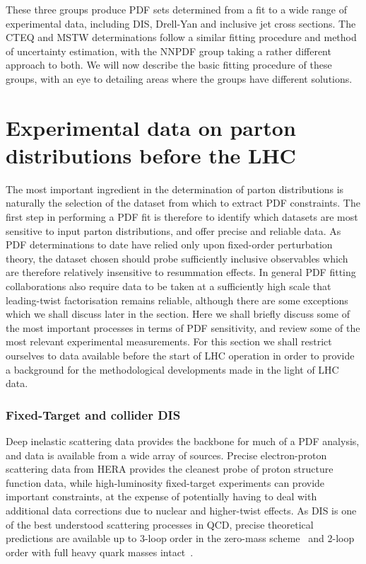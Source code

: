 These three groups produce PDF sets determined from a fit to a wide range of experimental data, including DIS, Drell-Yan and inclusive jet cross sections. The CTEQ and MSTW determinations follow a similar fitting procedure and method of uncertainty estimation, with the NNPDF group taking a rather different approach to both. We will now describe the basic fitting procedure of these groups, with an eye to detailing areas where the groups have different solutions.

\section{Experimental data on parton distributions before the LHC}
The most important ingredient in the determination of parton distributions is naturally the selection of the dataset from which to extract PDF constraints. The first step in performing a PDF fit is therefore to identify which datasets are most sensitive to input parton distributions, and offer precise and reliable data. As PDF determinations to date have relied only upon fixed-order perturbation theory, the dataset chosen should probe sufficiently inclusive observables which are therefore relatively insensitive to resummation effects. In general PDF fitting collaborations also require data to be taken at a sufficiently high scale that leading-twist factorisation remains reliable, although there are some exceptions which we shall discuss later in the section. Here we shall briefly discuss some of the most important processes in terms of PDF sensitivity, and review some of the most relevant experimental measurements. For this section we shall restrict ourselves to data available before the start of LHC operation in order to provide a background for the methodological developments made in the light of LHC data. 

\subsubsection{Fixed-Target and collider DIS}
Deep inelastic scattering data provides the backbone for much of a PDF analysis, and data is available from a wide array of sources. Precise electron-proton scattering data from HERA provides the cleanest probe of proton structure function data, while high-luminosity fixed-target experiments can provide important constraints, at the expense of potentially having to deal with additional data corrections due to nuclear and higher-twist effects. As DIS is one of the best understood scattering processes in QCD, precise theoretical predictions are available up to 3-loop order in the zero-mass scheme~\cite{Vermaseren:2005qc,Moch:2008fj} and 2-loop order with full heavy quark masses intact~\cite{Buza:1997mg,Buza:1996xr,Blumlein:2006mh,Bierenbaum:2007qe,Bierenbaum:2007dm,Bierenbaum:2009zt,Blumlein:2014fqa}.


